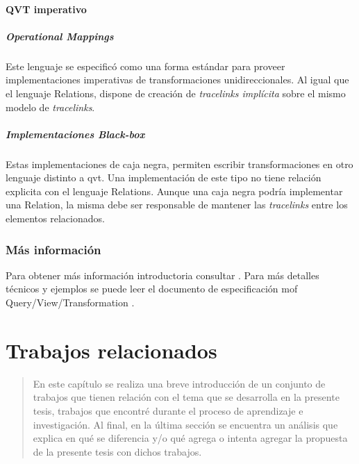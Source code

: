 \documentclass[a4paper,12pt,oneside,spanish]{book}
\begin{document}
\subsubsection{QVT imperativo}


\paragraph{Operational Mappings}

Este lenguaje se especificó como una forma estándar para proveer implementaciones imperativas de transformaciones unidireccionales. Al igual que el lenguaje \textsf{Relations}, dispone de creación de \textit{tracelinks implícita} sobre el mismo modelo de \textit{tracelinks}.


\paragraph{Implementaciones Black-box}

Estas implementaciones de caja negra, permiten escribir transformaciones en otro lenguaje distinto a \gls{qvt}. Una implementación de este tipo no tiene relación explicita con el lenguaje \textsf{Relations}. Aunque una caja negra podría implementar una \textsf{Relation}, la misma debe ser responsable de mantener las \textit{tracelinks} entre los elementos relacionados.


\subsection{Más información}

Para obtener más información introductoria consultar \cite{DSDPM}. Para más detalles técnicos y ejemplos se puede leer el documento de especificación \gls{mof} Query/View/Transformation \cite{QVT}.




\chapter{Trabajos relacionados}

\begin{quotation}
En este capítulo se realiza una breve introducción de un conjunto de trabajos que tienen relación con el tema que se desarrolla en la presente tesis, trabajos que encontré durante el proceso de aprendizaje e investigación. Al final, en la última sección se encuentra un análisis que explica en qué se diferencia y/o qué agrega o intenta agregar la propuesta de la presente tesis con dichos trabajos.
\end{quotation}
\end{document}
